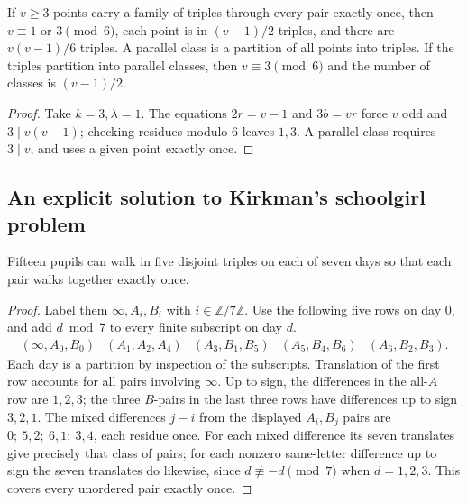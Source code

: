 \begin{corollary}\label{result44}
If \(v\ge3\) points carry a family of triples through every pair exactly once,
then \(v\equiv1\) or \(3\pmod6\), each point is in \((v-1)/2\) triples,
and there are \(v(v-1)/6\) triples. A parallel class is a partition of all
points into triples. If the triples partition into parallel classes, then
\(v\equiv3\pmod6\) and the number of classes is \((v-1)/2\).
\end{corollary}
\begin{proof}
Take \(k=3,\lambda=1\). The equations \(2r=v-1\) and \(3b=vr\)
force \(v\) odd and \(3\mid v(v-1)\); checking residues modulo \(6\)
leaves \(1,3\). A parallel class requires \(3\mid v\), and uses a
given point exactly once.
\end{proof}

\subsection{An explicit solution to Kirkman's schoolgirl problem}

\begin{proposition}\label{result45}
Fifteen pupils can walk in five disjoint triples on each of seven days
so that each pair walks together exactly once.
\end{proposition}
\begin{proof}
Label them \(\infty,A_i,B_i\) with \(i\in\mathbb Z/7\mathbb Z\). Use
the following five rows on day \(0\), and add \(d\bmod7\) to every finite
subscript on day \(d\).
\[
\begin{array}{ccccc}
(\infty,A_0,B_0)&(A_1,A_2,A_4)&(A_3,B_1,B_5)&
(A_5,B_4,B_6)&(A_6,B_2,B_3).
\end{array}
\]
Each day is a partition by inspection of the subscripts. Translation of the
first row accounts for all pairs involving \(\infty\). Up to sign, the
differences in the all-\(A\) row are \(1,2,3\); the three \(B\)-pairs
in the last three rows have differences up to sign \(3,2,1\).
The mixed differences \(j-i\) from the displayed \(A_i,B_j\) pairs are
\(0;\ 5,2;\ 6,1;\ 3,4\), each residue once. For each mixed difference
its seven translates give precisely that class of pairs; for each
nonzero same-letter difference up to sign the seven translates do likewise,
since \(d\not\equiv-d\pmod7\) when \(d=1,2,3\). This covers every
unordered pair exactly once.
\end{proof}

